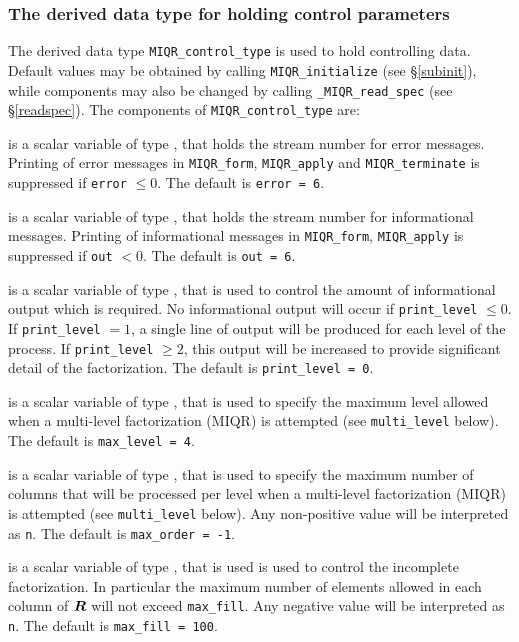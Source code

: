 \documentclass{galahad}
\newcommand{\packagename}{MIQR}
\newcommand{\fullpackagename}{\libraryname\_\packagename}
\begin{document}

\subsubsection{The derived data type for holding control 
 parameters}\label{typecontrol}
The derived data type 
{\tt \packagename\_control\_type} 
is used to hold controlling data. Default values may be obtained by calling 
{\tt \packagename\_initialize}
(see \S\ref{subinit}),
while components may also be changed by calling 
{\tt \fullpackagename\_read\-\_spec}
(see \S\ref{readspec}). 
The components of 
{\tt \packagename\_control\_type} 
are:

\begin{description}

 is a scalar variable of type \integer, that holds the
stream number for error messages. Printing of error messages in 
{\tt \packagename\_form}, {\tt \packagename\_apply} 
and {\tt \packagename\_terminate} 
is suppressed if {\tt error} $\leq 0$.
The default is {\tt error = 6}.

 is a scalar variable of type \integer, that holds the
stream number for informational messages. Printing of informational messages in 
{\tt \packagename\_form}, {\tt \packagename\_apply} 
is suppressed if {\tt out} $< 0$.
The default is {\tt out = 6}.

 is a scalar variable of type \integer, that is used
to control the amount of informational output which is required. No 
informational output will occur if {\tt print\_level} $\leq 0$. If 
{\tt print\_level} $= 1$, a single line of output will be produced for each
level of the process. If {\tt print\_level} $\geq 2$, this output will be
increased to provide significant detail of the factorization.
The default is {\tt print\_level = 0}.

 is a scalar variable of type \integer, that is used
to specify the maximum level allowed when a multi-level factorization (MIQR)
is attempted (see {\tt multi\_level} below).
The default is {\tt max\_level = 4}.

 is a scalar variable of type \integer, that is used
to specify the maximum number of columns that will be processed per level 
when a multi-level factorization (MIQR) is attempted 
(see {\tt multi\_level} below).
Any non-positive value will be interpreted as {\tt n}.
The default is {\tt max\_order = -1}.

 is a scalar variable of type \integer, that is used
is used to control the incomplete factorization. In particular
the maximum number of elements allowed in each column of ${\bm{R}}$ will not exceed
{\tt max\_fill}.
Any negative value will be interpreted as {\tt n}.
The default is {\tt max\_fill = 100}.


\end{description}
\end{document}
